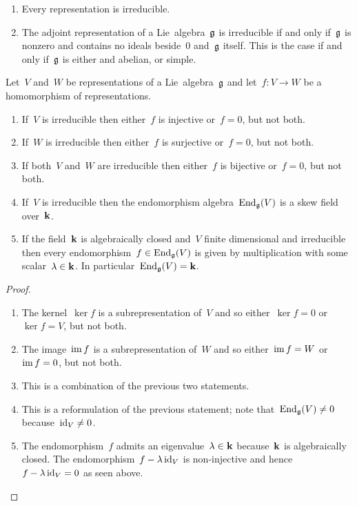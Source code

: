 \begin{example}
  \leavevmode
  \begin{enumerate}
    \item
      Every {\onedimensional} representation is irreducible.
    \item
      The adjoint representation of a Lie~algebra~$\mathfrak{g}$ is irreducible if and only if~$\mathfrak{g}$ is nonzero and contains no ideals beside~$0$ and~$\mathfrak{g}$ itself.
      This is the case if and only if~$\mathfrak{g}$ is either {\onedimensional} and abelian, or simple.
  \end{enumerate}
\end{example}


\begin{lemma}[Schur]
  Let~$V$ and~$W$ be representations of a Lie~algebra~$\mathfrak{g}$ and let~$f \colon V \to W$ be a homomorphism of representations.
  \begin{enumerate}
    \item
      If~$V$ is irreducible then either~$f$ is injective or~$f = 0$, but not both.
    \item
      If~$W$ is irreducible then either~$f$ is surjective or~$f = 0$, but not both.
    \item
      If both~$V$ and~$W$ are irreducible then either~$f$ is bijective or~$f = 0$, but not both.
    \item
      If~$V$ is irreducible then the endomorphism algebra~$\operatorname{End}_{\mathfrak{g}}(V)$ is a skew field over~$\mathbf{k}$.
    \item
      If the field~$\mathbf{k}$ is algebraically closed and~$V$ finite dimensional and irreducible then every endomorphism~$f \in \operatorname{End}_{\mathfrak{g}}(V)$ is given by multiplication with some scalar~$\lambda \in \mathbf{k}$.
      In particular~$\operatorname{End}_{\mathfrak{g}}(V) = \mathbf{k}$.
  \end{enumerate}
\end{lemma}


\begin{proof}
  \leavevmode
  \begin{enumerate}
    \item
      The kernel~$\ker f$ is a subrepresentation of~$V$ and so either~$\ker f = 0$ or~$\ker f = V$, but not both.
    \item
      The image~$\operatorname{im} f$ is a subrepresentation of~$W$ and so either~$\operatorname{im} f = W$ or~$\operatorname{im} f = 0$, but not both.
    \item
      This is a combination of the previous two statements.
    \item
      This is a reformulation of the previous statement;
      note that~$\operatorname{End}_{\mathfrak{g}}(V) \neq 0$ because~$\operatorname{id}_V \neq 0$.
    \item
      The endomorphism~$f$ admits an eigenvalue~$\lambda \in \mathbf{k}$ because~$\mathbf{k}$ is algebraically closed.
      The endomorphism~$f - \lambda \operatorname{id}_V$ is non-injective and hence~$f - \lambda \operatorname{id}_V = 0$ as seen above.
    \qedhere
  \end{enumerate}
\end{proof}




